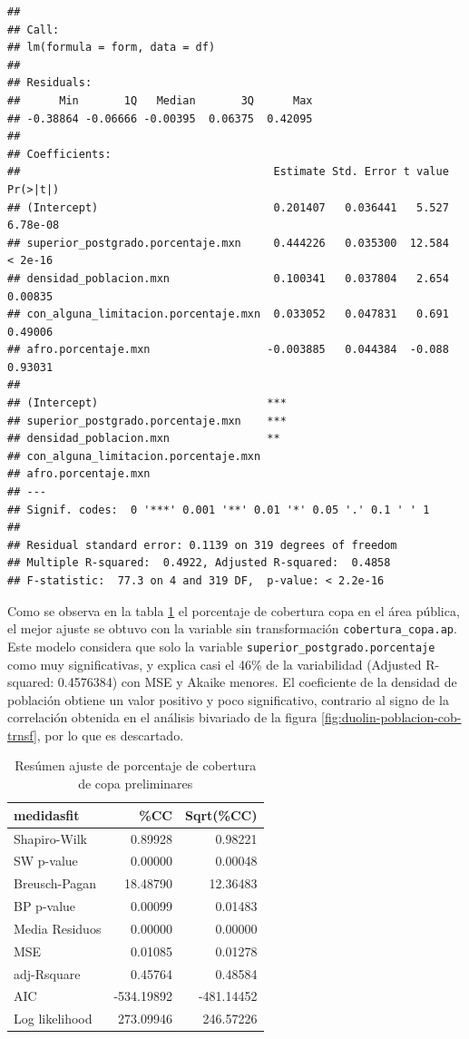 \documentclass[12pt,]{book}
\begin{document}
\begin{verbatim}
## 
## Call:
## lm(formula = form, data = df)
## 
## Residuals:
##      Min       1Q   Median       3Q      Max 
## -0.38864 -0.06666 -0.00395  0.06375  0.42095 
## 
## Coefficients:
##                                       Estimate Std. Error t value Pr(>|t|)
## (Intercept)                           0.201407   0.036441   5.527 6.78e-08
## superior_postgrado.porcentaje.mxn     0.444226   0.035300  12.584  < 2e-16
## densidad_poblacion.mxn                0.100341   0.037804   2.654  0.00835
## con_alguna_limitacion.porcentaje.mxn  0.033052   0.047831   0.691  0.49006
## afro.porcentaje.mxn                  -0.003885   0.044384  -0.088  0.93031
##                                         
## (Intercept)                          ***
## superior_postgrado.porcentaje.mxn    ***
## densidad_poblacion.mxn               ** 
## con_alguna_limitacion.porcentaje.mxn    
## afro.porcentaje.mxn                     
## ---
## Signif. codes:  0 '***' 0.001 '**' 0.01 '*' 0.05 '.' 0.1 ' ' 1
## 
## Residual standard error: 0.1139 on 319 degrees of freedom
## Multiple R-squared:  0.4922, Adjusted R-squared:  0.4858 
## F-statistic:  77.3 on 4 and 319 DF,  p-value: < 2.2e-16
\end{verbatim}

Como se observa en la tabla \ref{tab:comp-lmcopaap} el porcentaje de
cobertura copa en el área pública, el mejor ajuste se obtuvo con la
variable sin transformación \texttt{cobertura\_copa.ap}. Este modelo
considera que solo la variable \texttt{superior\_postgrado.porcentaje}
como muy significativas, y explica casi el 46\% de la variabilidad
(Adjusted R-squared: 0.4576384) con MSE y Akaike menores. El coeficiente
de la densidad de población obtiene un valor positivo y poco
significativo, contrario al signo de la correlación obtenida en el
análisis bivariado de la figura \ref{fig:duolin-poblacion-cob-trnsf},
por lo que es descartado.

\begin{table}

\caption{\label{tab:comp-lmcopaap}Resúmen ajuste de porcentaje de cobertura de copa preliminares}
\centering
\begin{tabular}[t]{l|r|r}
\hline
medidasfit & \%CC & Sqrt(\%CC)\\
\hline
Shapiro-Wilk & 0.89928 & 0.98221\\
\hline
SW p-value & 0.00000 & 0.00048\\
\hline
Breusch-Pagan & 18.48790 & 12.36483\\
\hline
BP p-value & 0.00099 & 0.01483\\
\hline
Media Residuos & 0.00000 & 0.00000\\
\hline
MSE & 0.01085 & 0.01278\\
\hline
adj-Rsquare & 0.45764 & 0.48584\\
\hline
AIC & -534.19892 & -481.14452\\
\hline
Log likelihood & 273.09946 & 246.57226\\
\hline
\end{tabular}
\end{table}
\end{document}
